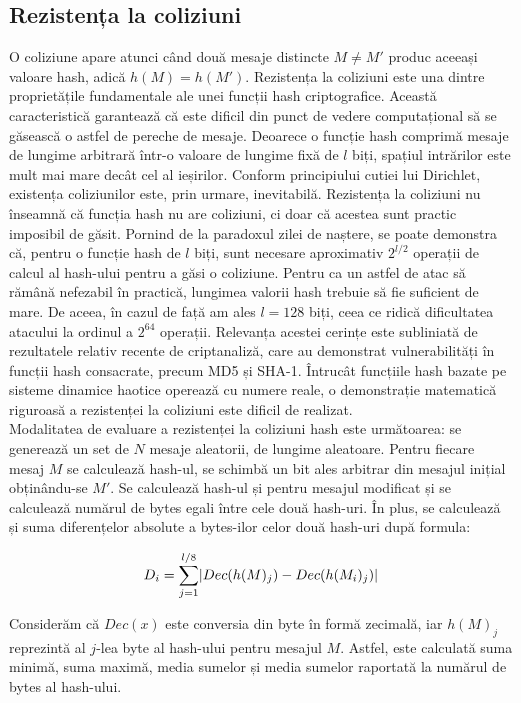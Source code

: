 \subsection{Rezistența la coliziuni}
O coliziune apare atunci când două mesaje distincte $M \neq M'$ produc aceeași valoare hash, adică $h(M) = h(M')$.
Rezistența la coliziuni este una dintre proprietățile fundamentale ale unei funcții hash criptografice.
Această caracteristică garantează că este dificil din punct de vedere computațional să se găsească o astfel de pereche de mesaje.
Deoarece o funcție hash comprimă mesaje de lungime arbitrară într-o valoare de lungime fixă de $l$ biți, spațiul intrărilor este mult mai mare decât cel al ieșirilor.
Conform principiului cutiei lui Dirichlet, existența coliziunilor este, prin urmare, inevitabilă.
Rezistența la coliziuni nu înseamnă că funcția hash nu are coliziuni, ci doar că acestea sunt practic imposibil de găsit.
Pornind de la paradoxul zilei de naștere, se poate demonstra că, pentru o funcție hash de $l$ biți, sunt necesare aproximativ $2^{l/2}$ operații de calcul al hash-ului pentru a găsi o coliziune.
Pentru ca un astfel de atac să rămână nefezabil în practică, lungimea valorii hash trebuie să fie suficient de mare.
De aceea, în cazul de față am ales $l=128$ biți, ceea ce ridică dificultatea atacului la ordinul a $2^{64}$ operații.
Relevanța acestei cerințe este subliniată de rezultatele relativ recente de criptanaliză, care au demonstrat vulnerabilități în funcții hash consacrate, precum MD5 și SHA-1.
Întrucât funcțiile hash bazate pe sisteme dinamice haotice operează cu numere reale, o demonstrație matematică riguroasă a rezistenței la coliziuni este dificil de realizat. \\

Modalitatea de evaluare a rezistenței la coliziuni hash este următoarea: se generează un set de $N$ mesaje aleatorii, de lungime aleatoare.
Pentru fiecare mesaj $M$ se calculează hash-ul, se schimbă un bit ales arbitrar din mesajul inițial obținându-se $M'$.
Se calculează hash-ul și pentru mesajul modificat și se calculează numărul de bytes egali între cele două hash-uri.
În plus, se calculează și suma diferențelor absolute a bytes-ilor celor două hash-uri după formula:

\begin{equation}
    D_i = \sum_{j=1}^{l/8} \lvert Dec(h(M)_j) - Dec(h(M_i)_j)\rvert
\end{equation}

Considerăm că $Dec(x)$ este conversia din byte în formă zecimală, iar $h(M)_j$ reprezintă al $j$-lea byte al hash-ului pentru mesajul $M$.
Astfel, este calculată suma minimă, suma maximă, media sumelor și media sumelor raportată la numărul de bytes al hash-ului.

